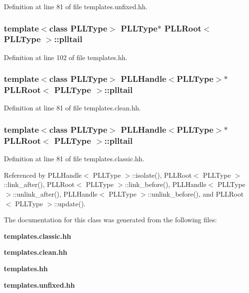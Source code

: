 Definition at line 81 of file templates.unfixed.hh.
\subsubsection{\setlength{\rightskip}{0pt plus 5cm}template$<$class PLLType$>$ {\bf PLLType}$\ast$ PLLRoot$<$ {\bf PLLType} $>$::plltail\hspace{0.3cm}{\tt  [protected]}}\label{classPLLRoot_n5}




Definition at line 102 of file templates.hh.
\subsubsection{\setlength{\rightskip}{0pt plus 5cm}template$<$class PLLType$>$ {\bf PLLHandle}$<${\bf PLLType}$>$$\ast$ PLLRoot$<$ {\bf PLLType} $>$::plltail\hspace{0.3cm}{\tt  [protected]}}\label{classPLLRoot_n3}




Definition at line 81 of file templates.clean.hh.
\subsubsection{\setlength{\rightskip}{0pt plus 5cm}template$<$class PLLType$>$ {\bf PLLHandle}$<${\bf PLLType}$>$$\ast$ PLLRoot$<$ {\bf PLLType} $>$::plltail\hspace{0.3cm}{\tt  [protected]}}\label{classPLLRoot_n1}




Definition at line 81 of file templates.classic.hh.

Referenced by PLLHandle$<$ PLLType $>$::isolate(), PLLRoot$<$ PLLType $>$::link\_\-after(), PLLRoot$<$ PLLType $>$::link\_\-before(), PLLHandle$<$ PLLType $>$::unlink\_\-after(), PLLHandle$<$ PLLType $>$::unlink\_\-before(), and PLLRoot$<$ PLLType $>$::update().

The documentation for this class was generated from the following files:\begin{CompactItemize}
\item 
{\bf templates.classic.hh}\item 
{\bf templates.clean.hh}\item 
{\bf templates.hh}\item 
{\bf templates.unfixed.hh}\end{CompactItemize}
